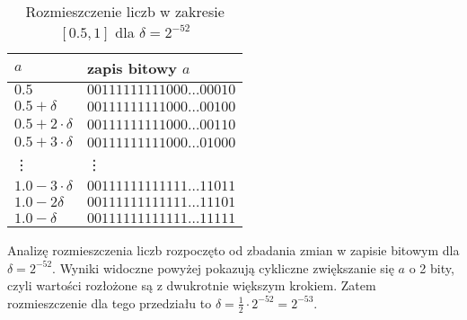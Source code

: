\documentclass{classrep}
\begin{document}
\begin{enumerate}
			\begin{table}[!h]
        		\centering
            	\begin{tabular}{ll} \toprule
                	$a$ & {zapis bitowy $a$} \\ \midrule
                	$0.5$ & $00111111111000\dots00010$ \\ 
 					$0.5+\delta$ & $00111111111000\dots00100$ \\
 					$0.5+2\cdot\delta$ & $00111111111000\dots00110$ \\
 					$0.5+3\cdot\delta$ & $00111111111000\dots01000$  \\
 					\vdots & \vdots \\
 					$1.0-3\cdot\delta$ & $00111111111111\dots11011$ \\
 					$1.0-2\delta$ & $00111111111111\dots11101$ \\
 					$1.0-\delta$ & $00111111111111\dots11111$ \\\bottomrule
            	\end{tabular}
            	\caption{Rozmieszczenie liczb w zakresie $[0.5,1]$ dla $\delta = 2^{-52}$}
			\label{table:6}
   			\end{table}
			
			Analizę rozmieszczenia liczb rozpoczęto od zbadania zmian w zapisie bitowym dla $\delta = 2^{-52}$. Wyniki 
			widoczne powyżej pokazują cykliczne zwiększanie się $a$ o 2 bity, czyli wartości rozłożone są z dwukrotnie 
			większym krokiem. Zatem rozmieszczenie dla tego przedziału to $\delta = \frac{1}{2} \cdot 2^{-52} = 2^{-53}$.
			\newline
				

\end{enumerate}
\end{document}
